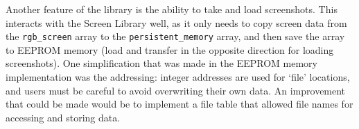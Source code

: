 \documentclass[a4paper,10pt]{article}
\begin{document}
Another feature of the library is the ability to take and load screenshots.
This interacts with the Screen Library well, as it only needs to copy screen
data from the \texttt{rgb\_screen} array to the \texttt{persistent\_memory}
array, and then save the array to EEPROM memory (load and transfer in the
opposite direction for loading screenshots).
One simplification that was made in the EEPROM memory implementation was the
addressing: integer addresses are used for `file' locations, and users must
be careful to avoid overwriting their own data. An improvement that could be
made would be to implement a file table that allowed file names for accessing
and storing data.
\end{document}
